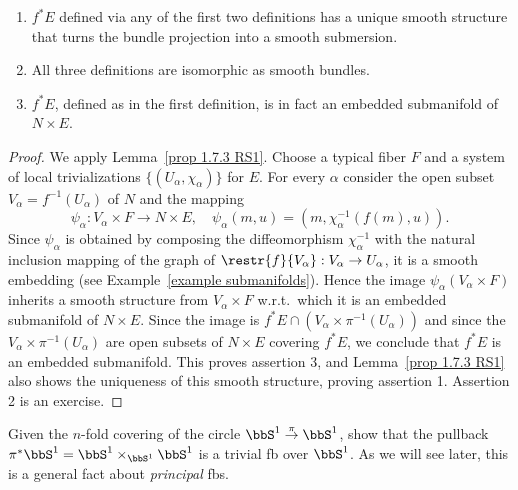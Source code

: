 \begin{prop}[{{\cite[Prop.~2.6.1]{RS1}}}]\label{prop 2.6.1 RS1}
\begin{enumerate}
    \item $f^\ast E$ defined via any of the first two definitions has a unique smooth structure that turns the bundle projection into a smooth submersion.
    \item All three definitions are isomorphic as smooth bundles.
    \item $f^\ast E$, defined as in the first definition, is in fact an embedded submanifold of $N\times E$.
\end{enumerate} 
\end{prop}
\begin{proof}
    We apply Lemma~\ref{prop 1.7.3 RS1}. Choose a typical fiber $F$ and a system of local trivializations $\{(U_\alpha,\chi_\alpha)\}$ for $E$. For every $\alpha$ consider the open subset $V_\alpha=f^{-1}(U_\alpha)$ of $N$ and the mapping  
    \[\psi_\alpha:V_\alpha\times F\to N\times E,\quad \psi_\alpha(m,u)=(m,\chi_\alpha^{-1}(f(m),u)).\]
    Since $\psi_\alpha$ is obtained by composing the diffeomorphism $\chi_\alpha^{-1}$ with the natural inclusion mapping of the graph of $\restr{f}{V_\alpha}:V_\alpha\to U_\alpha$, it is a smooth embedding (see Example~\ref{example submanifolds}). Hence the image $\psi_\alpha(V_\alpha\times F)$ inherits a smooth structure from $V_\alpha\times F$ w.r.t.\ which it is an embedded submanifold of $N\times E$. Since the image is $f^\ast E\cap (V_\alpha\times\pi^{-1}(U_\alpha))$ and since the $V_\alpha\times\pi^{-1}(U_\alpha)$ are open subsets of $N\times E$ covering $f^\ast E$, we conclude that $f^\ast E$ is an embedded submanifold. This proves assertion 3, and Lemma~\ref{prop 1.7.3 RS1} also shows the uniqueness of this smooth structure, proving assertion 1. Assertion 2 is an exercise.
\end{proof}

\begin{xca}
    Given the $n$-fold covering of the circle $\bbS^1\overset{\pi}{\to}\bbS^1$, show that the pullback $\pi^\ast \bbS^1=\bbS^1\times_{\bbS^1} \bbS^1$ is a trivial \gls{fb} over $\bbS^1$. As we will see later, this is a general fact about \emph{principal} \glspl{fb}.
\end{xca}

